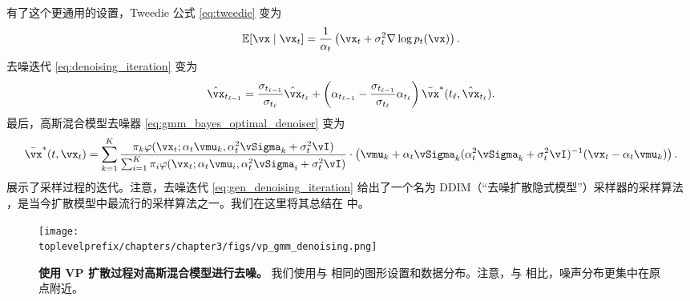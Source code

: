 \documentclass[../../book-main_zh.tex]{subfiles}
\begin{document}
有了这个更通用的设置，Tweedie 公式 \eqref{eq:tweedie} 变为
\begin{equation}\label{eq:gen_tweedie}
	\Ex[\vx \mid \vx_{t}] = \frac{1}{\alpha_{t}}\bp{\vx_{t} + \sigma_{t}^{2}\nabla \log p_{t}(\vx)}.
\end{equation}
去噪迭代 \eqref{eq:denoising_iteration} 变为
\begin{equation}\label{eq:gen_denoising_iteration}
	\hat{\vx}_{t_{\ell - 1}} = \frac{\sigma_{t_{\ell - 1}}}{\sigma_{t_{\ell}}}\hat{\vx}_{t_{\ell}} + \bp{\alpha_{t_{\ell - 1}} - \frac{\sigma_{t_{\ell - 1}}}{\sigma_{t_{\ell}}}\alpha_{t_{\ell}}}\bar{\vx}^{\ast}(t_{\ell}, \hat{\vx}_{t_{\ell}}).
\end{equation}
最后，高斯混合模型去噪器 \eqref{eq:gmm_bayes_optimal_denoiser} 变为
\begin{equation}\label{eq:gen_gmm_bayes_optimal_denoiser}
	\bar{\vx}^{\ast}(t, \vx_{t}) = \sum_{k = 1}^{K}\frac{\pi_{k}\phi(\vx_{t}
	; \alpha_{t}\vmu_{k}, \alpha_{t}^{2}\vSigma_{k}
	+ \sigma_{t}^{2}\vI)}{\sum_{i = 1}^{K}\pi_{i}\phi(\vx_{t} ; \alpha_{t}\vmu_{i}, \alpha_{t}^{2}\vSigma_{i} + \sigma_{t}^{2}\vI)}\cdot\bp{\vmu_{k} + \alpha_{t}\vSigma_{k}(\alpha_{t}^{2}\vSigma_{k} + \sigma_{t}^{2}\vI)^{-1}(\vx_{t} - \alpha_{t}\vmu_{k})}.
\end{equation}
 展示了采样过程的迭代。注意，去噪迭代 \eqref{eq:gen_denoising_iteration} 给出了一个名为 DDIM（“去噪扩散隐式模型”）采样器的采样算法 \cite{song2020denoising}，是当今扩散模型中最流行的采样算法之一。我们在这里将其总结在  中。

\begin{figure}
	\centering 
	\texttt{[image: \\toplevelprefix/chapters/chapter3/figs/vp\_gmm\_denoising.png]}
	\caption{\small\textbf{使用 VP 扩散过程对高斯混合模型进行去噪。} 我们使用与  相同的图形设置和数据分布。注意，与  相比，噪声分布更集中在原点附近。}
	\label{fig:vp_gmm_denoising}
\end{figure}
\end{document}
